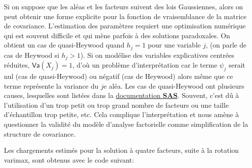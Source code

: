 \documentclass[
  11pt,
  letterpaper,
]{book}
\newenvironment{Shaded}{\begin{snugshade}}{\end{snugshade}}
\newcommand{\AttributeTok}[1]{\textcolor[rgb]{0.40,0.45,0.13}{#1}}
\newcommand{\CommentTok}[1]{\textcolor[rgb]{0.37,0.37,0.37}{#1}}
\newcommand{\FloatTok}[1]{\textcolor[rgb]{0.68,0.00,0.00}{#1}}
\newcommand{\FunctionTok}[1]{\textcolor[rgb]{0.28,0.35,0.67}{#1}}
\newcommand{\NormalTok}[1]{\textcolor[rgb]{0.00,0.23,0.31}{#1}}
\newcommand{\OtherTok}[1]{\textcolor[rgb]{0.00,0.23,0.31}{#1}}
\newcommand{\SpecialCharTok}[1]{\textcolor[rgb]{0.37,0.37,0.37}{#1}}
\theoremstyle{definition}
\theoremstyle{remark}
\begin{document}
Si on suppose que les aléas et les facteurs suivent des lois
Gaussiennes, alors on peut obtenir une forme explicite pour la fonction
de vraisemblance de la matrice de covariance. L'estimation des
paramètres requiert une optimisation numérique qui est souvent difficile
et qui mène parfois à des solutions paradoxales. On obtient un cas de
quasi-Heywood quand \(h_j=1\) pour une variable \(j\), (on parle de cas
de Heywood si \(h_j > 1\)). Si on modélise des variables explicatives
centrées réduites, \(\mathsf{Va}(X_j)=1\), d'où un problème
d'interprétation car le terme \(\psi_j\) serait nul (cas de
quasi-Heywood) ou négatif (cas de Heywood) alors même que ce terme
représente la variance du \(j\)e aléa. Les cas de quasi-Heywood ont
plusieurs causes, lesquelles sont listées dans la
\href{https://support.sas.com/documentation/cdl/en/statug/63033/HTML/default/viewer.htm\#statug_factor_sect022.htm}{documentation
\textbf{SAS}}. Souvent, c'est dû à l'utilisation d'un trop petit ou trop
grand nombre de facteurs ou une taille d'échantillon trop petite, etc.
Cela complique l'interprétation et nous amène à questionner la validité
du modèle d'analyse factorielle comme simplification de la structure de
covariance.

Les chargements estimés pour la solution à quatre facteurs, suite à la
rotation varimax, sont obtenus avec le code suivant:

\begin{Shaded}
\end{Shaded}
\end{document}
